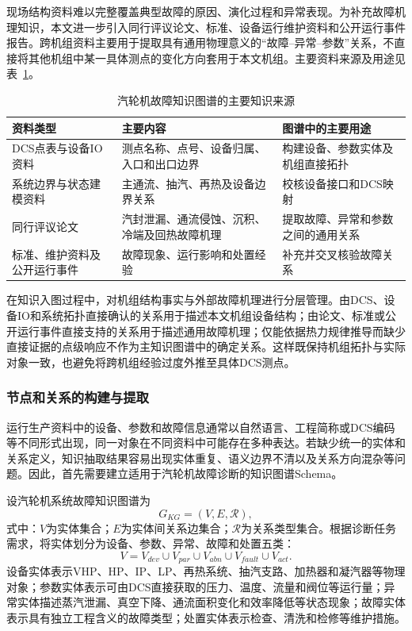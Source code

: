 现场结构资料难以完整覆盖典型故障的原因、演化过程和异常表现。为补充故障机理知识，本文进一步引入同行评议论文、标准、设备运行维护资料和公开运行事件报告。跨机组资料主要用于提取具有通用物理意义的“故障--异常--参数”关系，不直接将其他机组中某一具体测点的变化方向套用于本文机组。主要资料来源及用途见表~\ref{tab:kg_sources_v7}。

\begin{table}[htbp]
    \centering
    \caption{汽轮机故障知识图谱的主要知识来源}
    \label{tab:kg_sources_v7}
    \begin{tabular}{p{3.8cm}p{5.2cm}p{5.2cm}}
        \toprule
        资料类型 & 主要内容 & 图谱中的主要用途 \\
        \midrule
        DCS点表与设备IO资料 & 测点名称、点号、设备归属、入口和出口边界 & 构建设备、参数实体及机组直接拓扑 \\
        系统边界与状态建模资料 & 主通流、抽汽、再热及设备边界关系 & 校核设备接口和DCS映射 \\
        同行评议论文 & 汽封泄漏、通流侵蚀、沉积、冷端及回热故障机理 & 提取故障、异常和参数之间的通用关系 \\
        标准、维护资料及公开运行事件 & 故障现象、运行影响和处置经验 & 补充并交叉核验故障关系 \\
        \bottomrule
    \end{tabular}
\end{table}

在知识入图过程中，对机组结构事实与外部故障机理进行分层管理。由DCS、设备IO和系统拓扑直接确认的关系用于描述本文机组设备结构；由论文、标准或公开运行事件直接支持的关系用于描述通用故障机理；仅能依据热力规律推导而缺少直接证据的点级响应不作为主知识图谱中的确定关系。这样既保持机组拓扑与实际对象一致，也避免将跨机组经验过度外推至具体DCS测点。

\subsubsection{节点和关系的构建与提取}
\label{subsubsec:entity_relation_v7}

运行生产资料中的设备、参数和故障信息通常以自然语言、工程简称或DCS编码等不同形式出现，同一对象在不同资料中可能存在多种表达。若缺少统一的实体和关系定义，知识抽取结果容易出现实体重复、语义边界不清以及关系方向混杂等问题。因此，首先需要建立适用于汽轮机故障诊断的知识图谱Schema。

设汽轮机系统故障知识图谱为
\begin{equation}
G_{KG}=(V,E,\mathcal R),
\end{equation}
式中：$V$为实体集合；$E$为实体间关系边集合；$\mathcal R$为关系类型集合。根据诊断任务需求，将实体划分为设备、参数、异常、故障和处置五类：
\begin{equation}
V=V_{dev}\cup V_{par}\cup V_{abn}\cup V_{fault}\cup V_{act}.
\end{equation}
设备实体表示VHP、HP、IP、LP、再热系统、抽汽支路、加热器和凝汽器等物理对象；参数实体表示可由DCS直接获取的压力、温度、流量和阀位等运行量；异常实体描述蒸汽泄漏、真空下降、通流面积变化和效率降低等状态现象；故障实体表示具有独立工程含义的故障类型；处置实体表示检查、清洗和检修等维护措施。


